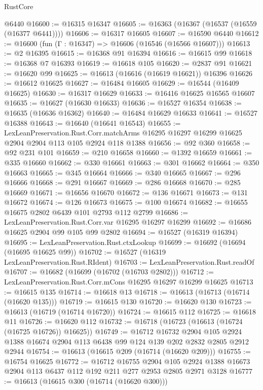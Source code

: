 \begin{lexlean}{RustCore}
\begin{coremodule}
    @6440
@16600 := @16315 @16347
@16605 := @16363 (@16367 (@16537 (@16559 (@16377 @6441))))
@16606 := @16317 @16605
@16607 := @16590 @6440
@16612 := @16600 (fun (Γ : @16347) => @16606 (@16546 (@16566 @16607)))
@16613 := @2 @16395
@16615 := @16368 @91 @16394
@16616 := @16615 @99
@16618 := @16368 @7 @16393
@16619 := @16618 @105
@16620 := @2837 @91
@16621 := @16620 @99
@16625 := @16613 (@16616 (@16619 @16621)) @16396
@16626 := @16612 @16625
@16627 := @16484 @16605
@16629 := @16544 (@16409 @16625)
@16630 := @16317 @16629
@16633 := @16416 @16625 @16565 @16607
@16635 := @16627 (@16630 @16633)
@16636 := @16527 @16354
@16638 := @16635 (@16636 @16362)
@16640 := @16484 @16629 @16633
@16641 := @16527 @16388
@16643 := @16640 (@16641 @16543)
@16655 := LexLeanPreservation.Rust.Corr.matchArms
    @16295
    @16297
    @16299
    @16625
    @2904
    @2904
    @113
    @105
    @2924
    @118
    @1388
@16656 := @92 @360
@16658 := @92 @231 @101
@16659 := @210 @16658
@16660 := @1392 @16659
@16661 := @335 @16660
@16662 := @330 @16661
@16663 := @301 @16662
@16664 := @350 @16663
@16665 := @345 @16664
@16666 := @340 @16665
@16667 := @296 @16666
@16668 := @291 @16667
@16669 := @286 @16668
@16670 := @285 @16669
@16671 := @16656 @16670
@16672 := @136 @16671
@16673 := @131 @16672
@16674 := @126 @16673
@16675 := @100 @16674
@16682 := @16655 @16675 @2802 @6439 @101 @2793 @112 @2799
@16686 := LexLeanPreservation.Rust.Corr.var @16295 @16297 @16299
@16692 := @16686 @16625 @2904 @99 @105 @99 @2802
@16694 := @16527 (@16319 @16394)
@16695 := LexLeanPreservation.Rust.ctxLookup
@16699 := @16692 (@16694 (@16695 @16625 @99))
@16702 := @16527 (@16319 LexLeanPreservation.Rust.RIdent)
@16703 := LexLeanPreservation.Rust.readOf
@16707 := @16682 (@16699 (@16702 (@16703 @2802)))
@16712 := LexLeanPreservation.Rust.Corr.mCons @16295 @16297 @16299 @16625
@16713 := @16615 @135
@16714 := @16618 @13
@16718 := @16613 (@16713 (@16714 (@16620 @135)))
@16719 := @16615 @130
@16720 := @16620 @130
@16723 := @16613 (@16719 (@16714 @16720))
@16724 := @16615 @112
@16725 := @16618 @11
@16726 := @16620 @112
@16732 := @16718 (@16723 (@16613 (@16724 (@16725 @16726)) @16625))
@16749 := @16712
    @16732
    @2904
    @105
    @2924
    @1388
    @16674
    @2904
    @113
    @6438
    @99
    @124
    @139
    @202
    @2832
    @2805
    @2912
    @2944
@16754 := @16613 (@16615 @209 (@16714 (@16620 @209)))
@16755 := @16754 @16625
@16772 := @16712
    @16755
    @2904
    @105
    @2924
    @1388
    @16673
    @2904
    @113
    @6437
    @112
    @192
    @211
    @277
    @2953
    @2805
    @2971
    @3128
@16777 := @16613 (@16615 @300 (@16714 (@16620 @300)))

\end{coremodule}
\end{lexlean}
